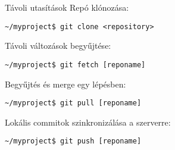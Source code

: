 
\begin{frame}[fragile]{Távoli utasítások}
    \pause
    Repó klónozása:
\small\begin{verbatim}
~/myproject$ git clone <repository>
\end{verbatim}\normalsize

    \pause
    Távoli változások begyűjtése:
\small\begin{verbatim}
~/myproject$ git fetch [reponame]
\end{verbatim}\normalsize

    \pause
    Begyűjtés és merge egy lépésben:
\small\begin{verbatim}
~/myproject$ git pull [reponame]
\end{verbatim}\normalsize

    \pause
    Lokális commitok szinkronizálása a szerverre:
\small\begin{verbatim}
~/myproject$ git push [reponame]
\end{verbatim}\normalsize
\end{frame}

